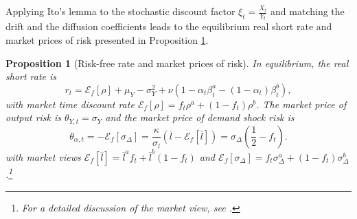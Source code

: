 \documentclass[preprint,11pt,authoryear]{elsarticle}
\theoremstyle{plain}
\newtheorem{prop}{Proposition}
\begin{document}
Applying Ito's lemma to the stochastic discount factor $\xi_t = \frac{X_t}{Y_t}$ and matching the drift and the diffusion coefficients leads to the equilibrium real short rate and market prices of risk presented in Proposition \ref{prop_rtandtheta}. 
 \begin{prop}[Risk-free rate and market prices of risk]\label{prop_rtandtheta}
In equilibrium, the real short rate is 
\begin{equation}\label{rt}
    r_t =  \mathcal{E}_{f}\left [ \rho \right]  + \mu_Y - \sigma_Y^2 + \nu\left(1 - \alpha_t \beta^a_t - \left(1-\alpha_t\right)\beta^b_t\right),
\end{equation}
with market time discount rate $\mathcal{E}_{f}\left [ \rho \right] = f_t \rho^a + \left(1-f_t\right)\rho^b$. The market price of output risk is $\theta_{Y,t} = \sigma_Y$ and the market price of demand shock risk is
\begin{equation}\label{theta_alphat}
	\theta_{\alpha,t}  = -\mathcal{E}_{f}\left [ \sigma_{\Delta}  \right]  = \frac{\kappa}{\sigma_l} ( 
	\bar{l} - \mathcal{E}_{f}\left[\bar{l} \right] ) 
	=  \sigma_{\Delta}\left(\frac{1}{2} - f_t \right).
\end{equation}
with market views $\mathcal{E}_{f}\left[\bar{l} \right]= \bar{l}^a f_t + \bar{l}^b  ( 1- f_t  )$ and $\mathcal{E}_{f} \left [ \sigma_{\Delta} \right] = f_t \sigma_{\Delta}^a  + \left(1-f_t\right)\sigma_{\Delta}^b$.\footnote{For a detailed discussion of the market view, see \cite{HLI2025}.}
\end{prop}
\end{document}
